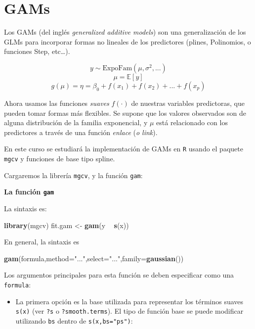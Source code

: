 \documentclass[]{book}
\newenvironment{Shaded}{\begin{snugshade}}{\end{snugshade}}
\newcommand{\KeywordTok}[1]{\textcolor[rgb]{0.13,0.29,0.53}{\textbf{#1}}}
\newcommand{\DataTypeTok}[1]{\textcolor[rgb]{0.13,0.29,0.53}{#1}}
\newcommand{\StringTok}[1]{\textcolor[rgb]{0.31,0.60,0.02}{#1}}
\newcommand{\OperatorTok}[1]{\textcolor[rgb]{0.81,0.36,0.00}{\textbf{#1}}}
\newcommand{\NormalTok}[1]{#1}
\providecommand{\tightlist}{%
  \setlength{\itemsep}{0pt}\setlength{\parskip}{0pt}}
\begin{document}
\section{GAMs}\label{gams}

Los GAMs (del inglés \emph{generalized additive models}) son una
generalización de los GLMs para incorporar formas no lineales de los
predictores (plines, Polinomios, o funciones Step, etc\ldots{}).

\[ y     \sim \mbox{ExpoFam}(\mu,\sigma^2,...)\]
\[ \mu   = \mathbb{E}[y]\]
\[ g(\mu)= \eta = \beta_0 + f(x_1) + f(x_2) + ... + f(x_p)\]

Ahora usamos las funciones \emph{suaves} \(f(\cdot)\) de nuestras
variables predictoras, que pueden tomar formas más flexibles. Se supone
que los valores observados son de alguna distribución de la familia
exponencial, y \(\mu\) está relacionado con los predictores a través de
una función \emph{enlace} (\emph{o link}).

En este curso se estudiará la implementación de GAMs en \texttt{R}
usando el paquete \texttt{mgcv} y funciones de base tipo spline.

Cargaremos la librería \texttt{mgcv}, y la función \texttt{gam}:

\textbf{La función \texttt{gam}}

La sintaxis es:

\begin{Shaded}
\begin{Highlighting}[]
\KeywordTok{library}\NormalTok{(mgcv)}
\NormalTok{fit.gam <-}\StringTok{ }\KeywordTok{gam}\NormalTok{(y }\OperatorTok{~}\StringTok{ }\KeywordTok{s}\NormalTok{(x))}
\end{Highlighting}
\end{Shaded}

En general, la sintaxis es

\begin{Shaded}
\begin{Highlighting}[]
\KeywordTok{gam}\NormalTok{(formula,}\DataTypeTok{method=}\StringTok{"..."}\NormalTok{,}\DataTypeTok{select=}\StringTok{"..."}\NormalTok{,}\DataTypeTok{family=}\KeywordTok{gaussian}\NormalTok{())}
\end{Highlighting}
\end{Shaded}

Los argumentos principales para esta función se deben especificar como
una \texttt{formula}:

\begin{itemize}
\tightlist
\item
  La primera opción es la base utilizada para representar los términos
  suaves \texttt{s(x)} (ver \texttt{?s} o \texttt{?smooth.terms}). El
  tipo de función base se puede modificar utilizando \texttt{bs} dentro
  de \texttt{s(x,bs="ps")}:
\end{itemize}
\end{document}
